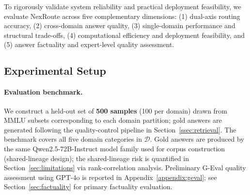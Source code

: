 \documentclass[a4paper,fleql]{cas-sc}
\begin{document}
To rigorously validate system reliability and practical deployment feasibility,
we evaluate NexRoute across five complementary dimensions:
(1) dual-axis routing accuracy,
(2) cross-domain answer quality,
(3) single-domain performance and structural trade-offs,
(4) computational efficiency and deployment feasibility, and
(5) answer factuality and expert-level quality assessment.

\subsection{Experimental Setup}
\label{ssec:setup}
\paragraph{Evaluation benchmark.}
We construct a held-out set of \textbf{500 samples} (100 per domain) drawn
from MMLU subsets corresponding to each domain partition; gold answers are
generated following the quality-control pipeline in Section~\ref{ssec:retrieval}.
The benchmark covers all five domain categories in $\mathcal{D}$.
Gold answers are produced by the same Qwen2.5-72B-Instruct model family
used for corpus construction (shared-lineage design); the shared-lineage
risk is quantified in Section~\ref{sec:limitations} via rank-correlation
analysis.
Preliminary G-Eval quality assessment using GPT-4o is reported in Appendix~\ref{appendix:geval}; see Section~\ref{sec:factuality} for primary factuality evaluation.
\end{document}
